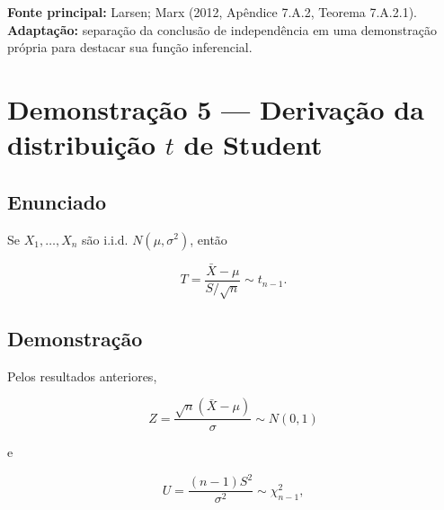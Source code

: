 \documentclass[
  letterpaper,
  DIV=11,
  numbers=noendperiod]{scrreprt}
\begin{document}
\begin{tcolorbox}[enhanced jigsaw, colback=white, leftrule=.75mm, colbacktitle=quarto-callout-note-color!10!white, breakable, titlerule=0mm, bottomtitle=1mm, title=\textcolor{quarto-callout-note-color}{\faInfo}\hspace{0.5em}{Fonte da demonstração}, colframe=quarto-callout-note-color-frame, toprule=.15mm, opacityback=0, bottomrule=.15mm, opacitybacktitle=0.6, arc=.35mm, toptitle=1mm, rightrule=.15mm, coltitle=black, left=2mm]

\textbf{Fonte principal:} Larsen; Marx (2012, Apêndice 7.A.2, Teorema
7.A.2.1).\\
\textbf{Adaptação:} separação da conclusão de independência em uma
demonstração própria para destacar sua função inferencial.

\end{tcolorbox}

\section*{\texorpdfstring{Demonstração 5 --- Derivação da distribuição
\(t\) de
Student}{Demonstração 5 --- Derivação da distribuição t de Student}}\label{demonstrauxe7uxe3o-5-derivauxe7uxe3o-da-distribuiuxe7uxe3o-t-de-student}


\subsection*{Enunciado}\label{enunciado-4}

Se \(X_1,\ldots,X_n\) são i.i.d. \(N(\mu,\sigma^2)\), então

\[
T=\frac{\bar X-\mu}{S/\sqrt n}
\sim t_{n-1}.
\]

\subsection*{Demonstração}\label{demonstrauxe7uxe3o-5}

Pelos resultados anteriores,

\[
Z=\frac{\sqrt n(\bar X-\mu)}{\sigma}\sim N(0,1)
\]

e

\[
U=\frac{(n-1)S^2}{\sigma^2}\sim\chi^2_{n-1},
\]
\end{document}
